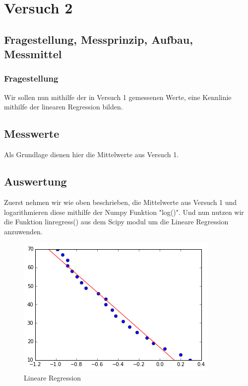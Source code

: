 \documentclass[TGAI_Laborbericht.tex]{subfiles}
\begin{document}
\chapter{Versuch 2}
\label{chap:VERSUCH_2}


\section{Fragestellung, Messprinzip, Aufbau, Messmittel}
\label{chap:VERSUCH_2_FRAGESTELLUNG}
\subsection{Fragestellung}
Wir sollen nun mithilfe der in Versuch 1 gemessenen Werte, eine Kennlinie mithilfe der linearen Regression bilden. 


\section{Messwerte}
\label{chap:VERSUCH_2_MESSWERTE}

Als Grundlage dienen hier die Mittelwerte aus Versuch 1.

\section{Auswertung}
\label{chap:VERSUCH_2_AUSWERTUNG}

Zuerst nehmen wir wie oben beschrieben, die Mittelwerte aus Versuch 1 und logarithmieren diese mithilfe der Numpy Funktion "log()". Und nun nutzen wir die Funktion linregress() aus dem Scipy modul um die Lineare Regression anzuwenden.
\begin{figure}[H]
\includegraphics[]{media/lineareregression.png}
\caption{Lineare Regression}
\end{figure}
\end{document}
